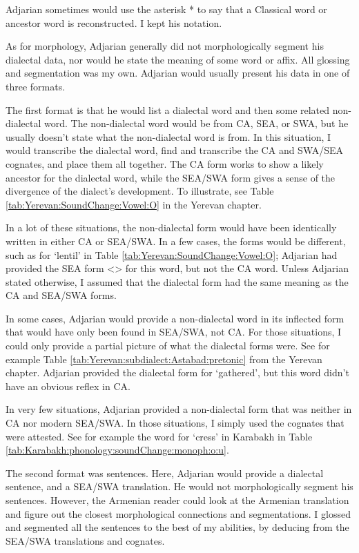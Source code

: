 Adjarian sometimes would use the asterisk * to say that a Classical word or ancestor word is reconstructed. I kept his notation. 

As for morphology,  Adjarian generally did not morphologically segment his dialectal data, nor would he state the meaning of some word or affix. All glossing and segmentation was my own. Adjarian would usually present his data in one of three formats. 


The first format is that he would list a dialectal word and then some related non-dialectal word. The non-dialectal word would be from CA, SEA, or SWA, but he usually doesn't state what the non-dialectal word is from. In this situation, I would transcribe the dialectal word, find and transcribe the CA and SWA/SEA cognates, and place them all together. The CA form works to show a likely ancestor for the dialectal word, while the SEA/SWA form gives a sense of the divergence of the dialect's development. To illustrate,  see Table \ref{tab:Yerevan:SoundChange:Vowel:O} in  the Yerevan chapter.  


In a lot of these situations, the non-dialectal form would have been identically written in either CA or SEA/SWA. In a few cases, the forms would be different, such as for `lentil' in Table \ref{tab:Yerevan:SoundChange:Vowel:O}; Adjarian had provided the SEA form <> for this word, but not the CA word. Unless Adjarian stated otherwise, I assumed that the dialectal form had the same meaning as the CA and SEA/SWA forms. 

In some cases, Adjarian would provide a non-dialectal word in its inflected form that would have only been found in SEA/SWA, not CA. For those situations, I could only provide a partial picture of what the dialectal forms were. See for example  Table \ref{tab:Yerevan:subdialect:Astabad:pretonic} from the Yerevan chapter. Adjarian provided the dialectal form for `gathered', but this word didn't have an obvious reflex in CA. 

In very few situations, Adjarian provided a non-dialectal form that was neither in CA nor modern SEA/SWA. In those situations, I simply used the cognates that were attested. See for example the word for `cress' in Karabakh in Table \ref{tab:Karabakh:phonology:soundChange:monoph:o:u}. 


The second format was   sentences. Here, Adjarian would provide a dialectal sentence, and a SEA/SWA translation. He would not morphologically segment his sentences. However, the Armenian reader could look at the Armenian translation and figure out the closest morphological connections and segmentations. I glossed and segmented all the sentences to the best of my abilities, by deducing from the SEA/SWA translations and cognates. 

